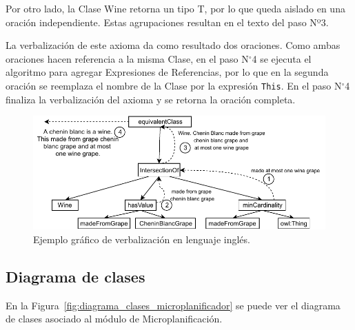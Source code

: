 Por otro lado, la Clase Wine retorna un tipo T, por lo que queda aislado en una oración independiente. Estas agrupaciones resultan en el texto del paso Nº3.

La verbalización de este axioma da como resultado dos oraciones. Como ambas oraciones hacen referencia a la misma Clase, en el paso N$^\circ$4  se ejecuta el algoritmo para agregar Expresiones de Referencias, por lo que en la segunda oración se reemplaza el nombre de la Clase por la expresión \texttt{This}. En el paso N$^\circ$4 finaliza la verbalización del axioma y se retorna la oración completa.

\begin{figure}
    \centering
    \includegraphics[width=\textwidth]{img/generacion_documento/verbalizacion_equivalentClass_english.pdf}
    \caption{Ejemplo gráfico de verbalización en lenguaje inglés.}
    \label{fig:ejemplo_verb_ingles}
\end{figure}

\subsection{Diagrama de clases}
En la Figura~\ref{fig:diagrama_clases_microplanificador} se puede ver el diagrama de clases asociado al módulo de Microplanificación.



